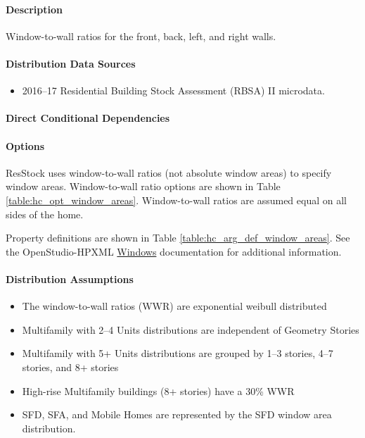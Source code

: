 \paragraph{Description}
% 
Window-to-wall ratios for the front, back, left, and right walls.

\paragraph{Distribution Data Sources}
% 
\begin{itemize}

\item
  2016--17 Residential Building Stock Assessment (RBSA) II microdata.
\end{itemize}

\paragraph{Direct Conditional Dependencies}


\paragraph{Options}
ResStock uses window-to-wall ratios (not absolute window areas) to specify window areas. Window-to-wall ratio options are shown in Table \ref{table:hc_opt_window_areas}. Window-to-wall ratios are assumed equal on all sides of the home.



Property definitions are shown in Table \ref{table:hc_arg_def_window_areas}. See the OpenStudio-HPXML \href{https://openstudio-hpxml.readthedocs.io/en/v1.10.0/workflow_inputs.html#hpxml-windows}{Windows} documentation for additional information.



\paragraph{Distribution Assumptions}
% 
\begin{itemize}

\item
  The window-to-wall ratios (WWR) are exponential weibull distributed
\item
  Multifamily with 2--4 Units distributions are independent of Geometry
  Stories
\item
  Multifamily with 5+ Units distributions are grouped by 1--3 stories,
  4--7 stories, and 8+ stories
\item
  High-rise Multifamily buildings (8+ stories) have a 30\% WWR
\item
  SFD, SFA, and Mobile Homes are represented by the SFD window area
  distribution.
\end{itemize}
